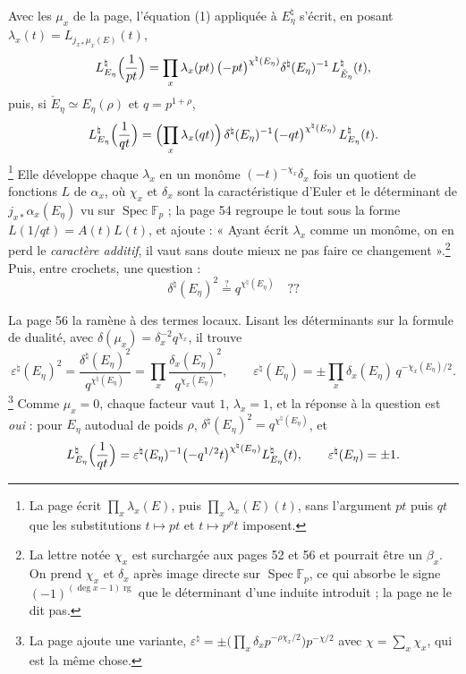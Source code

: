 \documentclass[11pt,a4paper]{article}
\begin{document}
Avec les $\mu_x$ de la page, l'équation (1) appliquée à $E_\eta^{\natural}$
s'écrit, en posant $\lambda_x(t) = L_{j_{x*}\mu_x(E)}(t)$,
\[
  L^{\natural}_{E_\eta}\Bigl(\frac{1}{pt}\Bigr)
  = \prod_x \lambda_x(pt)\,\bigl(-pt\bigr)^{\chi^{\natural}(E_\eta)}
    \delta^{\natural}(E_\eta)^{-1}\,L^{\natural}_{\check E_\eta}(t),
\]
puis, si $\check E_\eta \simeq E_\eta(\rho)$ et $q = p^{1+\rho}$,
\[
  L^{\natural}_{E_\eta}\Bigl(\frac{1}{qt}\Bigr)
  = \Bigl(\prod_x \lambda_x(qt)\Bigr)\,\delta^{\natural}(E_\eta)^{-1}
    \bigl(-qt\bigr)^{\chi^{\natural}(E_\eta)}\,L^{\natural}_{E_\eta}(t) .
\]
\footnote{La page écrit $\prod_x \lambda_x(E)$, puis $\prod_x \lambda_x(E)(t)$,
sans l'argument $pt$ puis $qt$ que les substitutions $t \mapsto pt$ et
$t \mapsto p^{\rho}t$ imposent.} Elle développe chaque $\lambda_x$ en un
monôme $(-t)^{-\chi_x}\delta_x$ fois un quotient de fonctions $L$ de
$\alpha_x$, où $\chi_x$ et $\delta_x$ sont la caractéristique d'Euler et le
déterminant de $j_{x*}\alpha_x(E_\eta)$ vu sur
$\operatorname{Spec}\mathbb{F}_p$ ; la page 54 regroupe le tout sous la forme
$L(1/qt) = A(t)L(t)$, et ajoute : « Ayant écrit $\lambda_x$ comme un monôme, on
en perd le \emph{caractère additif}, il vaut sans doute mieux ne pas faire ce
changement ».\footnote{La lettre notée $\chi_x$ est surchargée aux pages 52 et
56 et pourrait être un $\beta_x$. On prend $\chi_x$ et $\delta_x$ après
image directe sur $\operatorname{Spec}\mathbb{F}_p$, ce qui absorbe le signe
$(-1)^{(\deg x - 1)\operatorname{rg}}$ que le déterminant d'une induite
introduit ; la page ne le dit pas.} Puis, entre crochets, une question :
\[
  \delta^{\natural}(E_\eta)^2 \overset{?}{=} q^{\chi^{\natural}(E_\eta)} \quad ??
\]

La page 56 la ramène à des termes locaux. Lisant les déterminants sur la
formule de dualité, avec $\delta(\mu_x) = \delta_x^{-2}q^{\chi_x}$, il trouve
\[
  \varepsilon^{\natural}(E_\eta)^2 = \frac{\delta^{\natural}(E_\eta)^2}{q^{\chi^{\natural}(E_\eta)}}
  = \prod_x \frac{\delta_x(E_\eta)^2}{q^{\chi_x(E_\eta)}},
  \qquad
  \varepsilon^{\natural}(E_\eta) = \pm \prod_x \delta_x(E_\eta)\,q^{-\chi_x(E_\eta)/2} .
\]
\footnote{La page ajoute une variante,
$\varepsilon^{\natural} = \pm\bigl(\prod_x \delta_x p^{-\rho\chi_x/2}\bigr)p^{-\chi/2}$
avec $\chi = \sum_x \chi_x$, qui est la même chose.} Comme $\mu_x = 0$, chaque
facteur vaut $1$, $\lambda_x = 1$, et la réponse à la question est
\emph{oui} : pour $E_\eta$ autodual de poids $\rho$,
$\delta^{\natural}(E_\eta)^2 = q^{\chi^{\natural}(E_\eta)}$, et
\[
  L^{\natural}_{E_\eta}\Bigl(\frac{1}{qt}\Bigr)
  = \varepsilon^{\natural}(E_\eta)^{-1}\bigl(-q^{1/2}t\bigr)^{\chi^{\natural}(E_\eta)}
    L^{\natural}_{E_\eta}(t), \qquad \varepsilon^{\natural}(E_\eta) = \pm 1 .
\]
\end{document}
